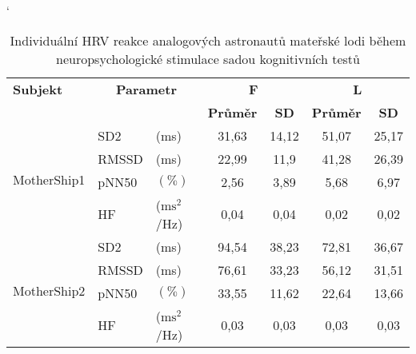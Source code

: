 \begin{table}[h]
    \catcode`
    \footnotesize
    \centering
    \caption{Individuální HRV reakce analogových astronautů mateřské lodi během neuropsychologické stimulace sadou kognitivních testů}
    \begin{threeparttable}
        \begin{tabular*}{\linewidth}{@{\extracolsep{\fill}} lllcccc @{}}
            \toprule
            \textbf{Subjekt}                & \multicolumn{2}{c}{\textbf{Parametr}} & \multicolumn{2}{c}{\textbf{F}} & \multicolumn{2}{c}{\textbf{L}}                                               \\ \cmidrule(rl){4-5} \cmidrule(rl){6-7}
            &                                       &                                & \textbf{Průměr}                & \textbf{SD} & \textbf{Průměr} & \textbf{SD} \\ \midrule
            \multirow[t]{4}{*}{MotherShip1} & SD2                                  & (ms)                           & 31,63                          & 14,12          & 51,07           & 25,17       \\
            & RMSSD                                 & (ms)                           & 22,99                          & 11,9        & 41,28           & 26,39       \\
            & pNN50                                 & $(\%)$                         & 2,56                           & 3,89        & 5,68            & 6,97        \\
            & HF                                    & ($\text{ms}^2$/Hz)                    & 0,04                           & 0,04        & 0,02            & 0,02        \\ \midrule
            \multirow[t]{4}{*}{MotherShip2} & SD2                                  & (ms)                           & 94,54                          & 38,23       & 72,81           & 36,67       \\
            & RMSSD                                 & (ms)                           & 76,61                           & 33,23       & 56,12            & 31,51       \\
            & pNN50                                 & $(\%)$                         & 33,55                          & 11,62       & 22,64           & 13,66       \\
            & HF                                    & ($\text{ms}^2$/Hz)                    & 0,03                           & 0,03        & 0,03            & 0,03        \\ \midrule

\end{tabular*}
\end{threeparttable}
\end{table}
